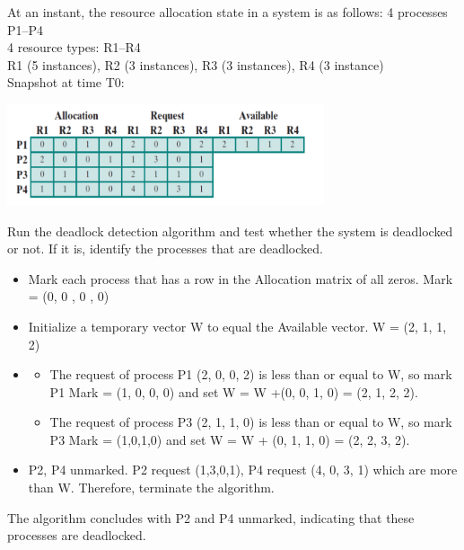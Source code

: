 \documentclass[12pt]{article}
\newenvironment{sol}[1][Solution]{\begin{trivlist}\item[\hskip\labelsep {\bfseries #1:}]}{\end{trivlist}}
\begin{document}
\begin{enumerate}
    \item At an instant, the resource allocation state in a system is as follows:
    4 processes P1–P4\\
    4 resource types: R1–R4\\
    R1 (5 instances), R2 (3 instances), R3 (3 instances), R4 (3 instance)\\
    Snapshot at time T0:\\
        \begin{center}
        \includegraphics[width=0.7\textwidth]{p2.png}
    \end{center}
    Run the deadlock detection algorithm and test whether the system is deadlocked or not. If it is, identify the processes that are deadlocked.
    \begin{sol}
    \hspace*{\fill}
        \begin{itemize}
            \item[(1)] Mark each process that has a row in the Allocation matrix of all zeros.
            Mark = (0, 0 , 0 , 0)
            \item[(2)] Initialize a temporary vector W to equal the Available vector.
            W = (2, 1, 1, 2)
            \item[(3)] \begin{itemize}
                \item[$\circ$] The request of process P1 (2, 0, 0, 2) is less than or equal to W, so mark P1 Mark = (1, 0, 0, 0) and set W = W +(0, 0, 1, 0) = (2, 1, 2, 2). 
                \item[$\circ$] The request of process P3 (2, 1, 1, 0) is less than or equal to W, so mark P3 Mark = (1,0,1,0) and set W = W + (0, 1, 1, 0) = (2, 2, 3, 2).
            \end{itemize}
            \item[(4)] P2, P4 unmarked. P2 request (1,3,0,1), P4 request (4, 0, 3, 1) which are more than W. Therefore, terminate the algorithm.
  
        \end{itemize}
                  The algorithm concludes with P2 and P4 unmarked, indicating that these processes are deadlocked.
    \end{sol}
    

\end{enumerate}
\end{document}
